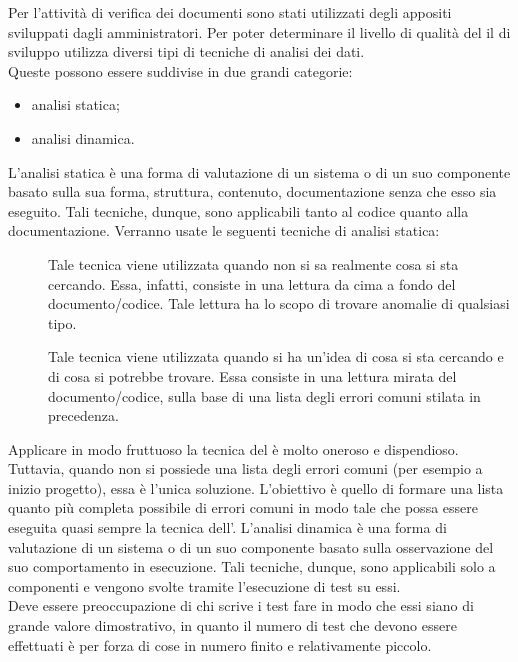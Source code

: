 	
	Per l'attività di verifica dei documenti sono stati utilizzati degli appositi  sviluppati dagli amministratori.
			Per poter determinare il livello di qualità del  il  di sviluppo utilizza diversi tipi di tecniche di analisi dei dati.\\
			Queste possono essere suddivise in due grandi categorie:
			\begin{itemize}
				\item analisi statica;
				\item analisi dinamica.
			\end{itemize}
				L'analisi statica è una forma di valutazione di un sistema o di un suo componente basato sulla sua forma, struttura, contenuto, documentazione senza che esso sia eseguito. Tali tecniche, dunque, sono applicabili tanto al codice quanto alla documentazione.
				Verranno usate le seguenti tecniche di analisi statica:
				\begin{description}
					\item[] Tale tecnica viene utilizzata quando non si sa realmente cosa si sta cercando. Essa, infatti, consiste in una lettura da cima a fondo del documento/codice. Tale lettura ha lo scopo di trovare anomalie di qualsiasi tipo.
					\item[] Tale tecnica viene utilizzata quando si ha un'idea di cosa si sta cercando e di cosa si potrebbe trovare. Essa consiste in una lettura mirata del documento/codice, sulla base di una lista degli errori comuni stilata in precedenza.
				\end{description}
				Applicare in modo fruttuoso la tecnica del  è molto oneroso e dispendioso. Tuttavia, quando non si possiede una lista degli	errori comuni (per esempio a inizio progetto), essa è l'unica soluzione. L'obiettivo è quello di formare una lista quanto più completa possibile di errori comuni in modo tale che possa essere eseguita quasi sempre la tecnica dell'.
				L'analisi dinamica è una forma di valutazione di un sistema  o di un suo componente basato sulla osservazione del suo comportamento in esecuzione. Tali tecniche, dunque, sono applicabili solo a componenti  e vengono svolte tramite l'esecuzione di test su essi.\\
				Deve essere preoccupazione di chi scrive i test fare in modo che essi siano di grande valore dimostrativo, in quanto il numero di test che devono essere effettuati è per forza di cose in numero finito e relativamente piccolo.
